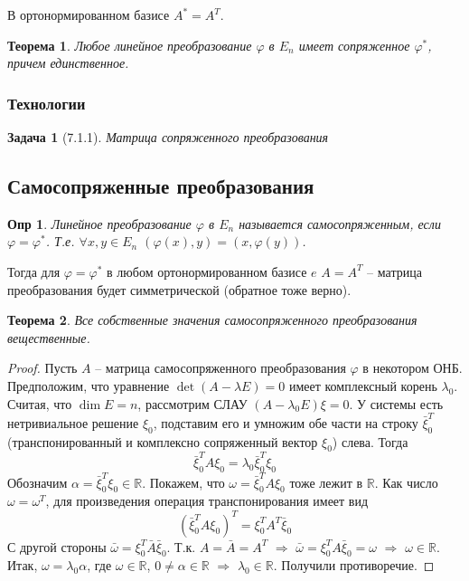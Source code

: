 \documentclass[a4paper,12pt]{article}
\newtheorem*{definition}{Опр}
\newtheorem{theorem}{Теорема}[section]
\newtheorem*{prob}{Задача}
\begin{document}
В ортонормированном базисе $A^* = A^T$.

\begin{theorem}
	Любое линейное преобразование $\varphi$ в $E_n$ имеет сопряженное $\varphi^*$, причем единственное.
\end{theorem}

\subsubsection{Технологии}
\begin{prob}[7.1.1]
	Матрица сопряженного преобразования
\end{prob}

\subsection{Самосопряженные преобразования}

\begin{definition}
	Линейное преобразование $\varphi$ в $E_n$ называется самосопряженным, если $\varphi = \varphi^*$. Т.е. $\forall x, y \in E_n$ $(\varphi(x), y) = (x, \varphi(y))$.
\end{definition}

Тогда для $\varphi = \varphi^*$ в любом ортонормированном базисе $e$ $A = A^T$ -- матрица преобразования будет симметрической (обратное тоже верно).

\begin{theorem}
	Все собственные значения самосопряженного преобразования вещественные.
\end{theorem}
\begin{proof}
	Пусть $A$ -- матрица самосопряженного преобразования $\varphi$ в некотором ОНБ. Предположим, что уравнение $\det(A - \lambda E) = 0$ имеет комплексный корень $\lambda_0$. Считая, что $\dim E = n$, рассмотрим СЛАУ $(A - \lambda_0 E) \xi = 0$. У системы есть нетривиальное решение $\xi_0$, подставим его и умножим обе части на строку $\bar{\xi}_0^T$ (транспонированный и комплексно сопряженный вектор $\xi_0$) слева. Тогда 
	\[
		\bar{\xi}_0^T A \xi_0 = \lambda_0 \bar{\xi}_0^T \xi_0
	\] 
	Обозначим $\alpha = \bar{\xi}_0^T \xi_0 \in \mathbb{R}$. Покажем, что $\omega =\bar{\xi}_0^T A \xi_0 $ тоже лежит в $\mathbb{R}$. Как число $\omega = \omega^T$, для произведения операция транспонирования имеет вид 
	\[
		(\bar{\xi}_0^T A \xi_0)^T = \xi_0^T A^T \bar{\xi}_0
	\]
	С другой стороны $\bar{\omega} = \xi_0^T \bar{A} \bar{\xi}_0$. Т.к. $A = \bar{A} = A^T$ $\Rightarrow$ $\bar{\omega} = \xi_0^T A \bar{\xi}_0 = \omega$ $\Rightarrow$ $\omega \in \mathbb{R}$. Итак, $\omega = \lambda_0 \alpha$, где $\omega \in \mathbb{R}$, $0 \ne \alpha \in \mathbb{R}$ $\Rightarrow$ $\lambda_0 \in \mathbb{R}$. Получили противоречие.
\end{proof}
\end{document}
